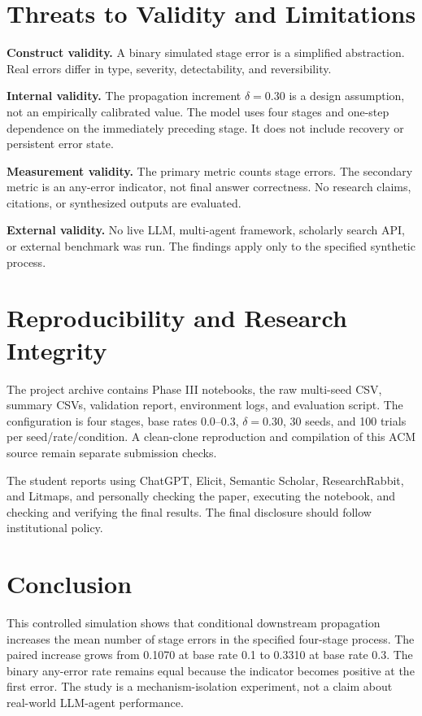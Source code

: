 \documentclass[sigconf,nonacm]{acmart}
\begin{document}
\section{Threats to Validity and Limitations}
\textbf{Construct validity.} A binary simulated stage error is a simplified abstraction. Real errors differ in type, severity, detectability, and reversibility.

\textbf{Internal validity.} The propagation increment $\delta=0.30$ is a design assumption, not an empirically calibrated value. The model uses four stages and one-step dependence on the immediately preceding stage. It does not include recovery or persistent error state.

\textbf{Measurement validity.} The primary metric counts stage errors. The secondary metric is an any-error indicator, not final answer correctness. No research claims, citations, or synthesized outputs are evaluated.

\textbf{External validity.} No live LLM, multi-agent framework, scholarly search API, or external benchmark was run. The findings apply only to the specified synthetic process.

\section{Reproducibility and Research Integrity}
The project archive contains Phase III notebooks, the raw multi-seed CSV, summary CSVs, validation report, environment logs, and evaluation script. The configuration is four stages, base rates 0.0--0.3, $\delta=0.30$, 30 seeds, and 100 trials per seed/rate/condition. A clean-clone reproduction and compilation of this ACM source remain separate submission checks.

The student reports using ChatGPT, Elicit, Semantic Scholar, ResearchRabbit, and Litmaps, and personally checking the paper, executing the notebook, and checking and verifying the final results. The final disclosure should follow institutional policy.

\section{Conclusion}
This controlled simulation shows that conditional downstream propagation increases the mean number of stage errors in the specified four-stage process. The paired increase grows from 0.1070 at base rate 0.1 to 0.3310 at base rate 0.3. The binary any-error rate remains equal because the indicator becomes positive at the first error. The study is a mechanism-isolation experiment, not a claim about real-world LLM-agent performance.



\end{document}
